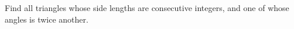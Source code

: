 \begin{problem} 

Find all triangles whose side lengths are consecutive integers, and one of whose angles is twice another.

\label{68IMO1}
    
\end{problem}